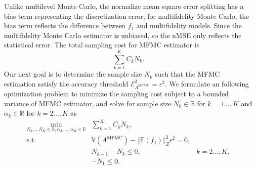 \documentclass[final,3p,times,11pt]{elsarticle}
\begin{document}
Unlike multilevel Monte Carlo, the normalize mean square error splitting has a bias term representing the discretization error, for multifidelity Monte Carlo, the bias term reflects the difference between $f_1$ and multifidelity models. Since the multifidelity Monte Carlo estimator is unbiased, so the nMSE only reflects the statistical error. The total sampling cost for MFMC estimator is 
\[
\sum_{k=1}^K C_kN_k.
\]
Our next goal is to determine the sample size $N_k$ such that the MFMC estimation satisfy the accuracy threshold $\mathcal{E}_{A^{\text{MFMC}}}^2= \epsilon^2$. We formulate an following optimization problem to minimize the sampling cost subject to a bounded variance of MFMC estimator, and solve for sample size $N_k\in \mathbb{R}$ for $k=1\dots, K$ and $\alpha_k\in \mathbb{R}$ for $k=2\dots, K$ as
\begin{equation}\label{eq:Optimization_pb}
    \begin{array}{lll}
    \displaystyle\min_{N_1,\ldots N_K\in \mathbb{R}, \alpha_2,\ldots,\alpha_K\in \mathbb{R}} &\sum_{k=1}^K C_kN_k,\\
       \text{s.t.} &\mathbb{V}\left(A^{\text{MFMC}}\right)- \left\Vert\mathbb{E}(f_1) \right\Vert_{Z}^2\epsilon^2 = 0,\\
        &\displaystyle N_{k-1}-N_k\le 0, &k=2\ldots,K,\\
        &\displaystyle -N_1\le 0. \\%
    \end{array}
\end{equation}
\end{document}
